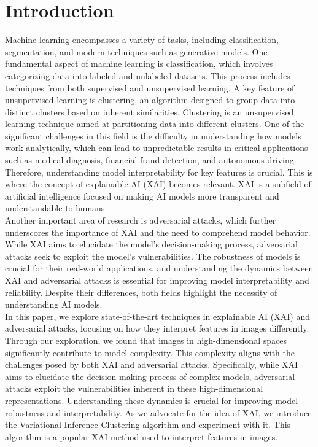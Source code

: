 \documentclass[12pt]{article}
\begin{document}
\section{Introduction}

Machine learning encompasses a variety of tasks, including classification, segmentation, and modern techniques such as generative models. 
One fundamental aspect of machine learning is classification, which involves categorizing data into labeled and unlabeled datasets. 
This process includes techniques from both supervised and unsupervised learning. 
A key feature of unsupervised learning is clustering, an algorithm designed to group data into distinct clusters based on inherent similarities.
Clustering is an unsupervised learning technique aimed at partitioning data into different clusters. 
One of the significant challenges in this field is the difficulty in understanding how models work analytically, which can lead to unpredictable results in critical applications such as medical diagnosis, financial fraud detection, and autonomous driving. 
Therefore, understanding model interpretability for key features is crucial. This is where the concept of explainable AI (XAI) becomes relevant. 
XAI is a subfield of artificial intelligence focused on making AI models more transparent and understandable to humans. \\

Another important area of research is adversarial attacks, which further underscores the importance of XAI and the need to comprehend model behavior. 
While XAI aims to elucidate the model's decision-making process, adversarial attacks seek to exploit the model's vulnerabilities.\cite{Athalye2018} \cite{Moosavi-Dezfooli2017}
The robustness of models is crucial for their real-world applications, and understanding the dynamics between XAI and adversarial attacks is essential for improving model interpretability and reliability. 
Despite their differences, both fields highlight the necessity of understanding AI models.\\

In this paper, we explore state-of-the-art techniques in explainable AI (XAI) and adversarial attacks, focusing on how they interpret features in images differently. 
Through our exploration, we found that images in high-dimensional spaces significantly contribute to model complexity. This complexity aligns with the challenges posed by both XAI and adversarial attacks. Specifically, while XAI aims to elucidate the decision-making process of complex models, adversarial attacks exploit the vulnerabilities inherent in these high-dimensional representations. Understanding these dynamics is crucial for improving model robustness and interpretability.
As we advocate for the idea of XAI, we introduce the Variational Inference Clustering algorithm and experiment with it. 
This algorithm is a popular XAI method used to interpret features in images.
\end{document}
